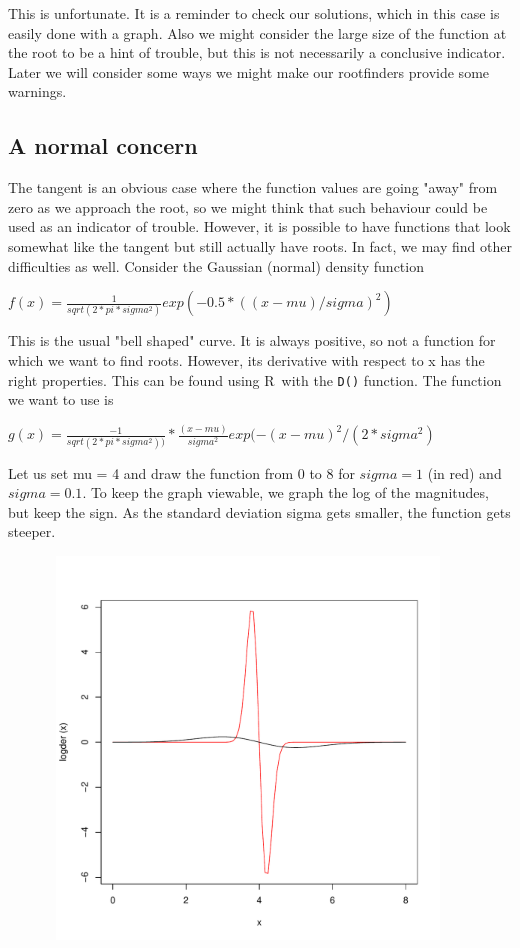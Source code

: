 \documentclass[11pt,letterpaper]{article}
\newcommand{\R}{{\sf R\ }}
\begin{document}
This is unfortunate. It is a reminder to check our solutions, which in this case
is easily done with a graph. Also we might consider the large size of the function
at the root to be a hint of trouble, but this is not necessarily a conclusive 
indicator. Later we will consider some ways we might make our
rootfinders provide some warnings.


\subsection{A normal concern}

The tangent is an obvious case where the function values are going "away" from 
zero as we approach the root, so we might think that such behaviour could be
used as an indicator of trouble. However, it is possible to have functions that
look somewhat like the tangent but still actually have roots. In fact, we may 
find other difficulties as well. Consider the Gaussian (normal) density function

$ f(x) = \frac{1}{sqrt(2 * pi * sigma^2) } exp(-0.5*((x - mu)/sigma)^2) $


This is the usual "bell shaped" curve. It is always positive, so not a function
for which we want to find roots. However, its derivative with respect to x has 
the right properties. This can be found using \R with the \texttt{D()} function. 
The function we want to use is 


$ g(x) = \frac{-1}{sqrt(2 * pi * sigma^2))} *  \frac{(x - mu)}{sigma^2} exp(-(x - mu)^2/(2 * sigma^2)  $


Let us set mu = 4 and draw the function from 0 to 8 for $sigma = 1$ (in red) and $sigma = 0.1$.
To keep the graph viewable, we graph the log of the magnitudes, but keep the sign. As the standard deviation sigma gets smaller, the function gets steeper.

\includegraphics[height=4in, width=5in]{logder.pdf}
\end{document}
